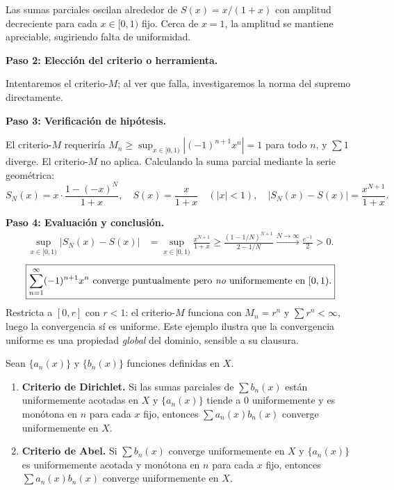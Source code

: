 \begin{example}
\begin{myproof}
Las sumas parciales oscilan alrededor de $S(x)=x/(1+x)$ con amplitud
decreciente para cada $x\in[0,1)$ fijo. Cerca de $x=1$, la amplitud
se mantiene apreciable, sugiriendo falta de uniformidad.

\textbf{Paso 2: Elección del criterio o herramienta.}

Intentaremos el criterio-$M$; al ver que falla, investigaremos la
norma del supremo directamente.

\textbf{Paso 3: Verificación de hipótesis.}

El criterio-$M$ requeriría $M_n \geq \sup_{x\in[0,1)}|(-1)^{n+1}x^n|
= 1$ para todo $n$, y $\sum 1$ diverge. El criterio-$M$ no aplica.
Calculando la suma parcial mediante la serie geométrica:
\[
    S_N(x) = x\cdot\frac{1-(-x)^N}{1+x}, \quad
    S(x) = \frac{x}{1+x} \quad (|x|<1),
    \quad
    |S_N(x) - S(x)| = \frac{x^{N+1}}{1+x}.
\]

\textbf{Paso 4: Evaluación y conclusión.}
\begin{align*}
    \sup_{x\in[0,1)} |S_N(x) - S(x)|
        &= \sup_{x\in[0,1)} \frac{x^{N+1}}{1+x}
         \geq \frac{(1-1/N)^{N+1}}{2-1/N}
         \xrightarrow{N\to\infty} \frac{e^{-1}}{2} > 0.
\end{align*}
\[
    \boxed{\sum_{n=1}^\infty (-1)^{n+1}x^n
    \text{ converge puntualmente pero \emph{no} uniformemente en }
    [0,1).}
\]
Restricta a $[0,r]$ con $r<1$: el criterio-$M$ funciona con
$M_n = r^n$ y $\sum r^n < \infty$, luego la convergencia sí es
uniforme. Este ejemplo ilustra que la convergencia uniforme es una
propiedad \emph{global} del dominio, sensible a su clausura.
\end{myproof}
\end{example}

\begin{theorem}
\label{thm:dirichlet_abel}
Sean $\{a_n(x)\}$ y $\{b_n(x)\}$ funciones definidas en $X$.
\begin{enumerate}
    \item \textbf{Criterio de Dirichlet.} Si las sumas parciales de
          $\sum b_n(x)$ están uniformemente acotadas en $X$ y
          $\{a_n(x)\}$ tiende a $0$ uniformemente y es monótona en
          $n$ para cada $x$ fijo, entonces $\sum a_n(x)b_n(x)$
          converge uniformemente en $X$.
    \item \textbf{Criterio de Abel.} Si $\sum b_n(x)$ converge
          uniformemente en $X$ y $\{a_n(x)\}$ es uniformemente
          acotada y monótona en $n$ para cada $x$ fijo, entonces
          $\sum a_n(x)b_n(x)$ converge uniformemente en $X$.
\end{enumerate}
\end{theorem}

